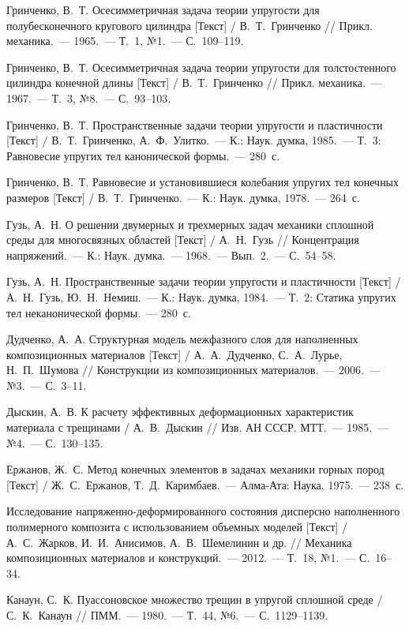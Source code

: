 \begin{biblist}{99}
Гринченко, В.~Т. 
Осесимметричная задача теории упругости для полубесконечного кругового цилиндра [Текст] 
/ В.~Т.~Гринченко 
// Прикл. механика.~--- 1965.~--- Т.~1, №1.~--- С.~109--119.

Гринченко, В.~Т. 
Осесимметричная задача теории упругости для толстостенного цилиндра конечной длины [Текст] 
/ В.~Т.~Гринченко 
// Прикл. механика.~--- 1967.~--- Т.~3, №8.~--- С.~93--103.

Гринченко, В.~Т. 
Пространственные задачи теории упругости и пластичности [Текст] 
/ В.~Т.~Гринченко, А.~Ф.~Улитко.~---  К.: Наук. думка, 1985.~--- Т.~3: Равновесие упругих тел канонической формы.~--- 280~с.

Гринченко, В.~Т. 
Равновесие и установившиеся колебания упругих тел конечных размеров [Текст] 
/ В.~Т.~Гринченко.~--- К.: Наук. думка, 1978.~--- 264~с.

Гузь, А.~Н. 
О решении двумерных и трехмерных задач механики сплошной среды для многосвязных областей [Текст] 
/ А.~Н.~Гузь 
// Концентрация напряжений.~--- К.: Наук. думка.~--- 1968.~--- Вып.~2.~--- С.~54--58.

Гузь, А.~Н. 
Пространственные задачи теории упругости и пластичности [Текст] 
/ А.~Н.~Гузь, Ю.~Н.~Немиш.~--- К.: Наук. думка, 1984.~--- Т.~2: Статика упругих тел неканонической формы.~--- 280~с.

Дудченко, А.~А. 
Структурная модель межфазного слоя для наполненных композиционных материалов [Текст] 
/ А.~А.~Дудченко, С.~А.~Лурье, Н.~П.~Шумова 
// Конструкции из композиционных материалов.~--- 2006.~--- №3.~--- С.~3--11.

Дыскин, А.~В. 
К расчету эффективных деформационных характеристик материала с трещинами  
/ А.~В.~Дыскин 
// Изв. АН СССР. МТТ.~--- 1985.~--- №4.~--- С.~130--135.

Ержанов, Ж.~С. Метод конечных элементов в задачах механики горных пород [Текст] 
/ Ж.~С.~Ержанов, Т.~Д.~Каримбаев.~--- Алма-Ата: Наука, 1975.~--- 238~с.

Исследование напряженно-деформированного состояния дисперсно наполненного полимерного композита с использованием объемных моделей [Текст] 
/ А.~С.~Жарков, И.~И.~Анисимов, А.~В.~Шемелинин и др. 
// Механика композиционных материалов и конструкций.~--- 2012.~--- Т.~18, №1.~--- С.~16--34.

Канаун, С.~К. 
Пуассоновское множество трещин в упругой сплошной среде  
/ С.~К.~Канаун 
// ПММ.~--- 1980.~--- Т.~44, №6.~--- С.~1129--1139.


\end{biblist}
